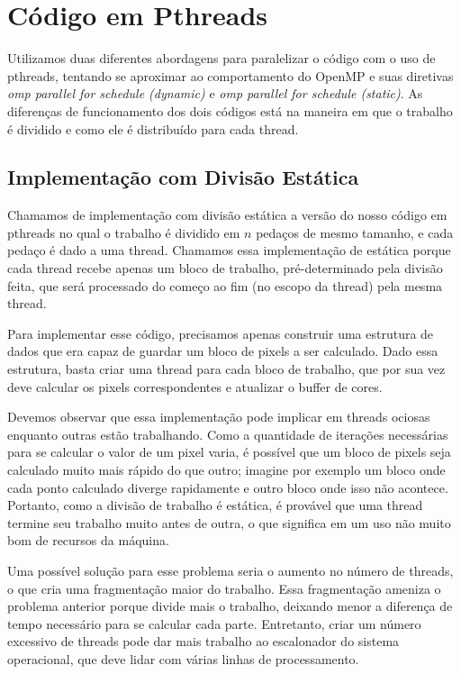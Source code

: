 \documentclass[12pt]{article}
\begin{document}
\newpage
\section{Código em Pthreads}
Utilizamos duas diferentes abordagens para paralelizar o código com
o uso de pthreads, tentando se aproximar ao comportamento do OpenMP e 
suas diretivas {\em omp parallel for schedule (dynamic)} e {\em omp 
parallel for schedule (static)}. As diferenças de funcionamento dos 
dois códigos está na maneira em que o trabalho é dividido e como ele é
distribuído para cada thread.

\subsection{Implementação com Divisão Estática}
Chamamos de implementação com divisão estática a versão do nosso 
código em pthreads no qual o trabalho é dividido em $n$ pedaços de mesmo 
tamanho, e cada pedaço é dado a uma thread. Chamamos essa implementação
de estática porque cada thread recebe apenas um bloco de trabalho,
pré-determinado pela divisão feita, que será processado do começo ao
fim (no escopo da thread) pela mesma thread.

Para implementar esse código, precisamos apenas construir uma estrutura
de dados que era capaz de guardar um bloco de pixels a ser calculado.
Dado essa estrutura, basta criar uma thread para cada bloco de trabalho,
que por sua vez deve calcular os pixels correspondentes e atualizar o 
buffer de cores.

Devemos observar que essa implementação pode implicar em threads ociosas
enquanto outras estão trabalhando. Como a quantidade de iterações
necessárias para se calcular o valor de um pixel varia, é possível que
um bloco de pixels seja calculado muito mais rápido do que outro; 
imagine por exemplo um bloco onde cada ponto calculado diverge 
rapidamente e outro bloco onde isso não acontece. Portanto, como a 
divisão de trabalho é estática, é provável que uma thread termine seu
trabalho muito antes de outra, o que significa em um uso não muito bom
de recursos da máquina.

Uma possível solução para esse problema seria o aumento no número de 
threads, o que cria uma fragmentação maior do trabalho. Essa 
fragmentação ameniza o problema anterior porque divide mais o trabalho,
deixando menor a diferença de tempo necessário para se calcular cada 
parte. Entretanto, criar um número excessivo de threads pode dar mais
trabalho ao escalonador do sistema operacional, que deve lidar com 
várias linhas de processamento.
\end{document}
